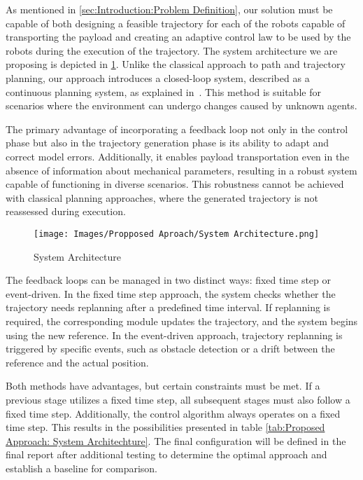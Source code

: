 As mentioned in \ref{sec:Introduction:Problem Definition}, our solution must be capable of both designing a feasible trajectory for each of the robots capable of transporting the payload and creating an adaptive control law to be used by the robots during the execution of the trajectory. The system architecture we are proposing is depicted in \ref{fig:Proposed Approach: System Architecture : System Architecture}. Unlike the classical approach to path and trajectory planning, our approach introduces a closed-loop system, described as a continuous planning system, as explained in~\cite{durfee1999survey}. This method is suitable for scenarios where the environment can undergo changes caused by unknown agents. 

The primary advantage of incorporating a feedback loop not only in the control phase but also in the trajectory generation phase is its ability to adapt and correct model errors. Additionally, it enables payload transportation even in the absence of information about mechanical parameters, resulting in a robust system capable of functioning in diverse scenarios. This robustness cannot be achieved with classical planning approaches, where the generated trajectory is not reassessed during execution.

\begin{figure}[H]
    \centering
    \texttt{[image: Images/Propposed Aproach/System Architecture.png]}
    \caption{System Architecture}
    \label{fig:Proposed Approach: System Architecture : System Architecture}
\end{figure}

The feedback loops can be managed in two distinct ways: fixed time step or event-driven. In the fixed time step approach, the system checks whether the trajectory needs replanning after a predefined time interval. If replanning is required, the corresponding module updates the trajectory, and the system begins using the new reference. In the event-driven approach, trajectory replanning is triggered by specific events, such as obstacle detection or a drift between the reference and the actual position. 

Both methods have advantages, but certain constraints must be met. If a previous stage utilizes a fixed time step, all subsequent stages must also follow a fixed time step. Additionally, the control algorithm always operates on a fixed time step. This results in the possibilities presented in table \ref{tab:Proposed Approach: System Architechture}. The final configuration will be defined in the final report after additional testing to determine the optimal approach and establish a baseline for comparison.

